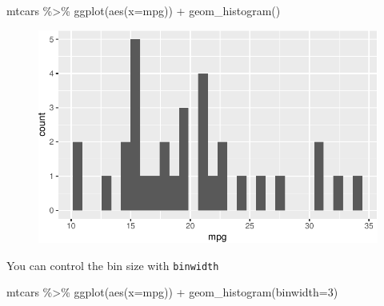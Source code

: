 \documentclass[
  letterpaper,
  DIV=11,
  numbers=noendperiod]{scrartcl}
\newenvironment{Shaded}{\begin{snugshade}}{\end{snugshade}}
\newcommand{\AttributeTok}[1]{\textcolor[rgb]{0.40,0.45,0.13}{#1}}
\newcommand{\DecValTok}[1]{\textcolor[rgb]{0.68,0.00,0.00}{#1}}
\newcommand{\FunctionTok}[1]{\textcolor[rgb]{0.28,0.35,0.67}{#1}}
\newcommand{\NormalTok}[1]{\textcolor[rgb]{0.00,0.23,0.31}{#1}}
\newcommand{\SpecialCharTok}[1]{\textcolor[rgb]{0.37,0.37,0.37}{#1}}
\begin{document}
\begin{Shaded}
\begin{Highlighting}[]
\NormalTok{mtcars }\SpecialCharTok{\%\textgreater{}\%} 
  \FunctionTok{ggplot}\NormalTok{(}\FunctionTok{aes}\NormalTok{(}\AttributeTok{x=}\NormalTok{mpg)) }\SpecialCharTok{+}
  \FunctionTok{geom\_histogram}\NormalTok{()}
\end{Highlighting}
\end{Shaded}

\begin{figure}[H]

{\centering \includegraphics{118_F_ggplot2_files/figure-pdf/unnamed-chunk-4-1.pdf}

}

\end{figure}

You can control the bin size with \texttt{binwidth}

\begin{Shaded}
\begin{Highlighting}[]
\NormalTok{mtcars }\SpecialCharTok{\%\textgreater{}\%} 
  \FunctionTok{ggplot}\NormalTok{(}\FunctionTok{aes}\NormalTok{(}\AttributeTok{x=}\NormalTok{mpg)) }\SpecialCharTok{+}
  \FunctionTok{geom\_histogram}\NormalTok{(}\AttributeTok{binwidth=}\DecValTok{3}\NormalTok{)}
\end{Highlighting}
\end{Shaded}
\end{document}
